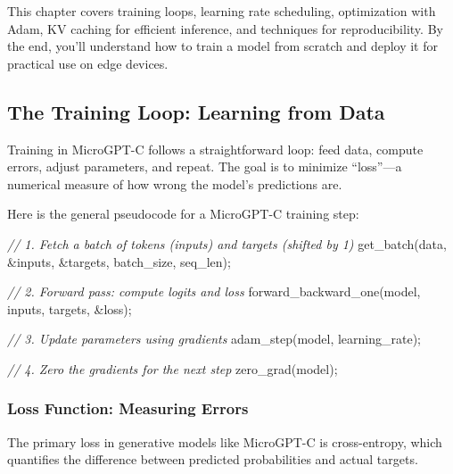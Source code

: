 \documentclass[
]{article}
\newenvironment{Shaded}{}{}
\newcommand{\CommentTok}[1]{\textcolor[rgb]{0.38,0.63,0.69}{\textit{#1}}}
\newcommand{\NormalTok}[1]{#1}
\newcommand{\OperatorTok}[1]{\textcolor[rgb]{0.40,0.40,0.40}{#1}}
\begin{document}
This chapter covers training loops, learning rate scheduling,
optimization with Adam, KV caching for efficient inference, and
techniques for reproducibility. By the end, you'll understand how to
train a model from scratch and deploy it for practical use on edge
devices.

\subsection{The Training Loop: Learning from
Data}\label{the-training-loop-learning-from-data}

Training in MicroGPT-C follows a straightforward loop: feed data,
compute errors, adjust parameters, and repeat. The goal is to minimize
``loss''---a numerical measure of how wrong the model's predictions are.

Here is the general pseudocode for a MicroGPT-C training step:

\begin{Shaded}
\begin{Highlighting}[]
\CommentTok{// 1. Fetch a batch of tokens (inputs) and targets (shifted by 1)}
\NormalTok{get\_batch}\OperatorTok{(}\NormalTok{data}\OperatorTok{,} \OperatorTok{\&}\NormalTok{inputs}\OperatorTok{,} \OperatorTok{\&}\NormalTok{targets}\OperatorTok{,}\NormalTok{ batch\_size}\OperatorTok{,}\NormalTok{ seq\_len}\OperatorTok{);}

\CommentTok{// 2. Forward pass: compute logits and loss}
\NormalTok{forward\_backward\_one}\OperatorTok{(}\NormalTok{model}\OperatorTok{,}\NormalTok{ inputs}\OperatorTok{,}\NormalTok{ targets}\OperatorTok{,} \OperatorTok{\&}\NormalTok{loss}\OperatorTok{);} 

\CommentTok{// 3. Update parameters using gradients}
\NormalTok{adam\_step}\OperatorTok{(}\NormalTok{model}\OperatorTok{,}\NormalTok{ learning\_rate}\OperatorTok{);}

\CommentTok{// 4. Zero the gradients for the next step}
\NormalTok{zero\_grad}\OperatorTok{(}\NormalTok{model}\OperatorTok{);}
\end{Highlighting}
\end{Shaded}

\subsubsection{Loss Function: Measuring
Errors}\label{loss-function-measuring-errors}

The primary loss in generative models like MicroGPT-C is cross-entropy,
which quantifies the difference between predicted probabilities and
actual targets.
\end{document}
